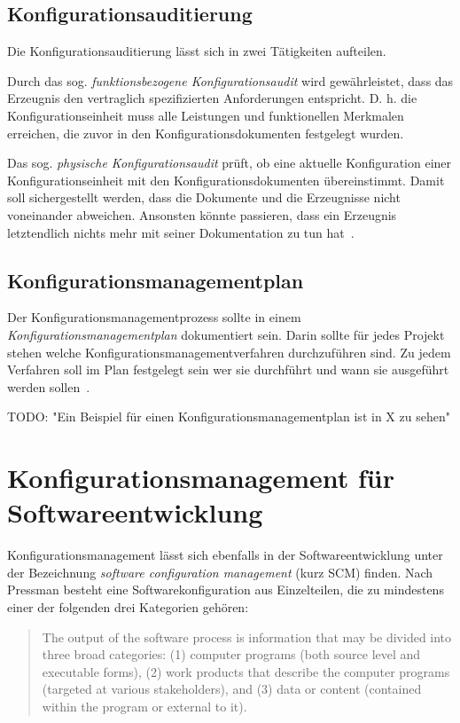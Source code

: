 \documentclass[runningheads,a4paper]{uwsese}
\begin{document}
\subsection{Konfigurationsauditierung}
Die Konfigurationsauditierung lässt sich in zwei Tätigkeiten aufteilen.

Durch das sog. {\em funktionsbezogene Konfigurationsaudit} wird gewährleistet,
dass das Erzeugnis den vertraglich spezifizierten Anforderungen entspricht.
D. h. die Konfigurationseinheit muss alle Leistungen und funktionellen Merkmalen
erreichen, die zuvor in den Konfigurationsdokumenten festgelegt wurden.

Das sog. {\em physische Konfigurationsaudit} prüft, ob eine aktuelle
Konfiguration einer Konfigurationseinheit mit den Konfigurationsdokumenten
übereinstimmt. Damit soll sichergestellt werden, dass die Dokumente und die
Erzeugnisse nicht voneinander abweichen. Ansonsten könnte passieren, dass
ein Erzeugnis letztendlich nichts mehr mit seiner Dokumentation zu tun
hat~\cite[S. 7]{weischedel2002}.

\subsection{Konfigurationsmanagementplan}
Der Konfigurationsmanagementprozess sollte in einem
{\em Konfigurationsmanagementplan} dokumentiert sein. Darin sollte für jedes
Projekt stehen welche Konfigurationsmanagementverfahren durchzuführen sind. Zu
jedem Verfahren soll im Plan festgelegt sein wer sie durchführt und wann sie
ausgeführt werden sollen~\cite[S. 7f]{weischedel2002}.

TODO: "Ein Beispiel für einen Konfigurationsmanagementplan ist in X zu sehen"

\section{Konfigurationsmanagement für Softwareentwicklung}

Konfigurationsmanagement lässt sich ebenfalls in der Softwareentwicklung
unter der Bezeichnung {\em software configuration management} (kurz SCM)
finden. Nach Pressman \cite[p. 585f]{Pressman:2009:SEP:1593949} besteht eine
Softwarekonfiguration aus Einzelteilen, die zu mindestens einer der folgenden
drei Kategorien gehören:

\begin{quote}
  The output of the software process is information that may be divided into three
  broad categories: (1) computer programs (both source level and executable forms),
  (2) work products that describe the computer programs (targeted at various
  stakeholders), and (3) data or content (contained within the program or external
  to it).
\end{quote}
\end{document}
